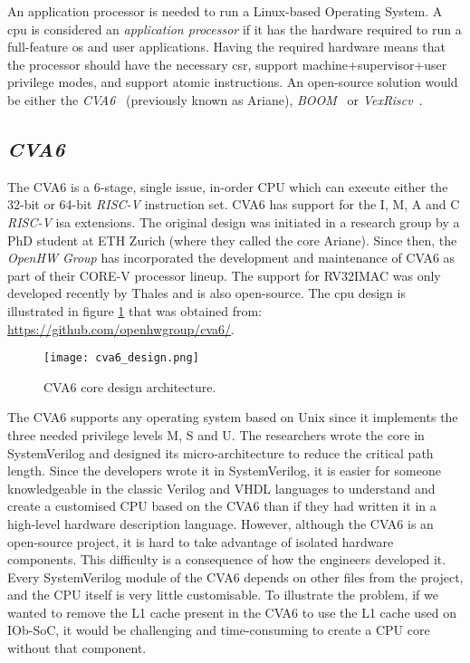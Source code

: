 An application processor is needed to run a Linux-based Operating System. A \acrshort{cpu} is considered an \textit{application processor} if it has the hardware required to run a full-feature \acrfull{os} and user applications. Having the required hardware means that the processor should have the necessary \acrfull{csr}, support \acrshort{machine}+\acrshort{supervisor}+\acrshort{user} privilege modes, and support atomic instructions. An open-source solution would be either the \textit{CVA6}~\cite{zaruba2019cost} (previously known as Ariane), \textit{BOOM}~\cite{zhaosonicboom} or \textit{VexRiscv}~\cite{vexriscv}.

\subsection{\textit{CVA6}}
The CVA6 is a 6-stage, single issue, in-order CPU which can execute either the 32-bit or 64-bit \textit{RISC-V} instruction set. CVA6 has support for the I, M, A and C \textit{RISC-V} \acrshort{isa} extensions. The original design was initiated in a research group by a PhD student at ETH Zurich (where they called the core Ariane). Since then, the \textit{OpenHW Group} has incorporated the development and maintenance of CVA6 as part of their CORE-V processor lineup. The support for RV32IMAC was only developed recently by Thales and is also open-source. The \acrshort{cpu} design is illustrated in figure \ref{fig:cva6_design} that was obtained from: \url{https://github.com/openhwgroup/cva6/}.

\begin{figure}[!h]
    \centering
    \texttt{[image: cva6\_design.png]}
    \caption{CVA6 core design architecture.}
    \label{fig:cva6_design}
\end{figure}

The CVA6 supports any operating system based on Unix since it implements the three needed privilege levels M, S and U. The researchers wrote the core in SystemVerilog and designed its micro-architecture to reduce the critical path length. Since the developers wrote it in SystemVerilog, it is easier for someone knowledgeable in the classic Verilog and VHDL languages to understand and create a customised CPU based on the CVA6 than if they had written it in a high-level hardware description language. However, although the CVA6 is an open-source project, it is hard to take advantage of isolated hardware components. This difficulty is a consequence of how the engineers developed it. Every SystemVerilog module of the CVA6 depends on other files from the project, and the CPU itself is very little customisable. To illustrate the problem, if we wanted to remove the L1 cache present in the CVA6 to use the L1 cache used on IOb-SoC, it would be challenging and time-consuming to create a CPU core without that component.

